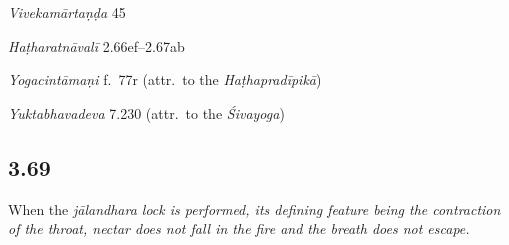 \begin{ekdosis}
\begin{sources}[hp03_068]
\emph{Vivekamārtaṇḍa} 45
\begin{versinnote}
\end{versinnote}
\end{sources}

\begin{testimonia}[hp03_068]
\emph{Haṭharatnāvalī} 2.66ef–2.67ab
\begin{versinnote}
\end{versinnote}

\emph{Yogacintāmaṇi} f.~77r (attr.~to the \emph{Haṭhapradīpikā})
\begin{versinnote}
\end{versinnote}

\emph{Yuktabhavadeva} 7.230 (attr.~to the \emph{Śivayoga})
\begin{versinnote}
\end{versinnote}

\end{testimonia}



\subsection*{3.69}
\begin{translation}[hp03_069]
When the \sl{jālandhara} lock is performed, its defining feature being the contraction of the throat, nectar does not fall in the fire and the breath does not escape.
\end{translation}


\end{ekdosis}
